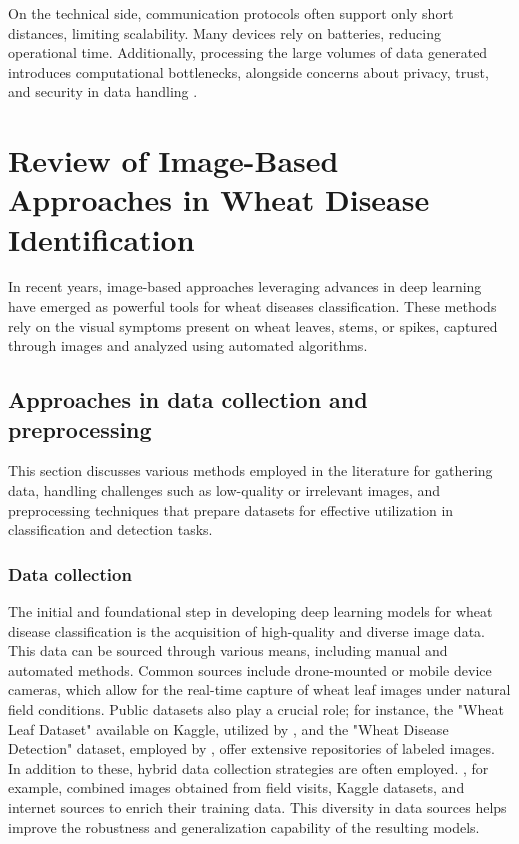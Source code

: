 On the technical side, communication protocols often support only short distances, limiting scalability. Many devices rely on batteries, reducing operational time. Additionally, processing the large volumes of data generated introduces computational bottlenecks, alongside concerns about privacy, trust, and security in data handling \parencite{idoje2021survey}.



\section{Review of Image-Based Approaches in Wheat Disease Identification}

In recent years, image-based approaches leveraging advances in deep learning have emerged as powerful tools for wheat diseases classification. These methods rely on the visual symptoms present on wheat leaves, stems, or spikes, captured through images and analyzed using automated algorithms.



\subsection{Approaches in data collection and preprocessing }
This section discusses various methods employed in the literature for gathering data, handling challenges such as low-quality or irrelevant images, and preprocessing techniques that prepare datasets for effective utilization in classification and detection tasks.

\subsubsection{Data collection}
The initial and foundational step in developing deep learning models for wheat disease classification is the acquisition of high-quality and diverse image data. This data can be sourced through various means, including manual and automated methods. Common sources include drone-mounted or mobile device cameras, which allow for the real-time capture of wheat leaf images under natural field conditions. Public datasets also play a crucial role; for instance, the "Wheat Leaf Dataset" available on Kaggle, utilized by \parencite{ramadan2024improving}, and the "Wheat Disease Detection" dataset, employed by \parencite{reis2024integrated}, offer extensive repositories of labeled images. In addition to these, hybrid data collection strategies are often employed. \parencite{hassan2024wheat}, for example, combined images obtained from field visits, Kaggle datasets, and internet sources to enrich their training data. This diversity in data sources helps improve the robustness and generalization capability of the resulting models.


